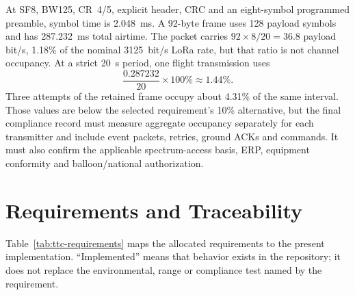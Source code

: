 At SF8, BW125, CR~4/5, explicit header, CRC and an eight-symbol programmed
preamble, symbol time is 2.048~ms. A 92-byte frame uses 128 payload symbols and
has 287.232~ms total airtime. The packet carries $92\times8/20=36.8$ payload
bit/s, 1.18\% of the nominal 3125~bit/s LoRa rate, but that ratio is not channel
occupancy. At a strict 20~s period, one flight transmission uses
\begin{equation}
\frac{0.287232}{20}\times100\% \approx 1.44\%.
\end{equation}
Three attempts of the retained frame occupy about 4.31\% of the same interval.
Those values are below the selected requirement's 10\% alternative, but the
final compliance record must measure aggregate occupancy separately for each
transmitter and include event packets, retries, ground ACKs and commands. It
must also confirm the applicable spectrum-access basis, ERP, equipment
conformity and balloon/national authorization.


\section{Requirements and Traceability}

Table~\ref{tab:ttc-requirements} maps the allocated requirements to the
present implementation. ``Implemented'' means that behavior exists in the
repository; it does not replace the environmental, range or compliance test
named by the requirement.

